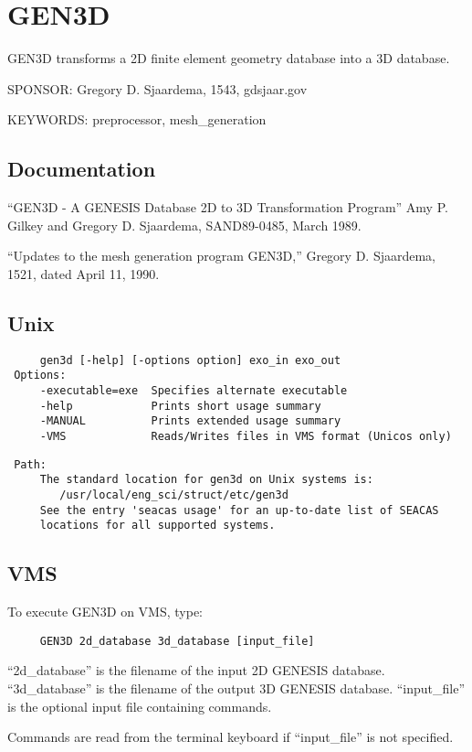 
\section{GEN3D}
GEN3D transforms a 2D finite element geometry database into a 3D database.

SPONSOR:  Gregory D. Sjaardema, 1543, gdsjaar\@sandia.gov

KEYWORDS: preprocessor, mesh\_generation
\subsection{Documentation  }
``GEN3D - A GENESIS Database 2D to 3D Transformation Program''
Amy P. Gilkey and Gregory D. Sjaardema, SAND89-0485,
March 1989.

``Updates to the mesh generation program GEN3D,''
Gregory D. Sjaardema, 1521, dated April 11, 1990.

\subsection{Unix}
\begin{verbatim}
     gen3d [-help] [-options option] exo_in exo_out
 Options:
     -executable=exe  Specifies alternate executable
     -help            Prints short usage summary
     -MANUAL          Prints extended usage summary
     -VMS             Reads/Writes files in VMS format (Unicos only)
\end{verbatim}
\begin{verbatim}
 Path:
     The standard location for gen3d on Unix systems is:
        /usr/local/eng_sci/struct/etc/gen3d
     See the entry 'seacas usage' for an up-to-date list of SEACAS
     locations for all supported systems.
\end{verbatim}
\subsection{VMS}
To execute GEN3D on VMS, type:

\begin{verbatim}
     GEN3D 2d_database 3d_database [input_file]
\end{verbatim}

``2d\_database'' is the filename of the input  2D GENESIS database.
``3d\_database'' is the filename of the output 3D GENESIS database.
``input\_file''  is the optional input file containing commands.

Commands are read from the terminal keyboard if ``input\_file''
is not specified.
